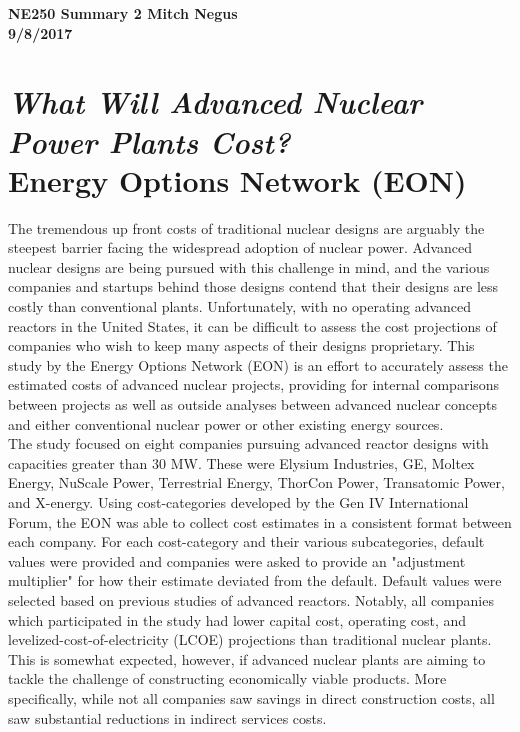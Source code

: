 \documentclass{report}
\newcommand{\tab}{\-\hspace{1cm}}
\begin{document}
\thispagestyle{empty}

{\bf {\large {NE250 Summary {2} \hfill Mitch Negus\\
		\hspace*{\fill} 9/8/2017\\ }}}
\section*{\textsl{What Will Advanced Nuclear Power Plants Cost?} \\ \normalsize Energy Options Network (EON)}

\tab The tremendous up front costs of traditional nuclear designs are arguably the steepest barrier facing the widespread adoption of nuclear power. Advanced nuclear designs are being pursued with this challenge in mind, and the various companies and startups behind those designs contend that their designs are less costly than conventional plants. Unfortunately, with no operating advanced reactors in the United States, it can be difficult to assess the cost projections of companies who wish to keep many aspects of their designs proprietary. This study by the Energy Options Network (EON) is an effort to accurately assess the estimated costs of advanced nuclear projects, providing for internal comparisons between projects  as well as outside analyses between advanced nuclear concepts and either conventional nuclear power or other existing energy sources.\\
\tab The study focused on eight companies pursuing advanced reactor designs with capacities greater than 30 MW. These were Elysium Industries, GE, Moltex Energy, NuScale Power, Terrestrial Energy, ThorCon Power, Transatomic Power, and X-energy. Using cost-categories developed by the Gen IV International Forum, the EON was able to collect cost estimates in a consistent format between each company. For each cost-category and their various subcategories, default values were provided and companies were asked to provide an "adjustment multiplier" for how their estimate deviated from the default. Default values were selected based on previous studies of advanced reactors. Notably, all companies which participated in the study had lower capital cost, operating cost, and levelized-cost-of-electricity (LCOE) projections than traditional nuclear plants. This is somewhat expected, however, if advanced nuclear plants are aiming to tackle the challenge of constructing economically viable products. More specifically, while not all companies saw savings in direct construction costs, all saw substantial reductions in indirect services costs.\\
\end{document}
